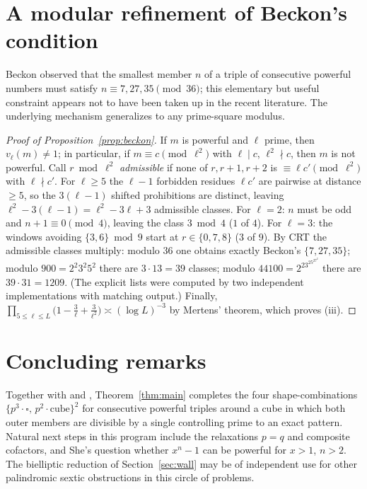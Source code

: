 \documentclass[11pt]{article}
\theoremstyle{remark}
\newcommand{\vp}{v}
\begin{document}
\section{A modular refinement of Beckon's condition}\label{sec:beckon}

Beckon \cite{Beckon} observed that the smallest member $n$ of a triple of consecutive powerful numbers must satisfy $n\equiv7,27,35\pmod{36}$; this elementary but useful constraint appears not to have been taken up in the recent literature. The underlying mechanism generalizes to any prime-square modulus.

\begin{proof}[Proof of Proposition~\ref{prop:beckon}]
If $m$ is powerful and $\ell$ prime, then $\vp_\ell(m)\neq1$; in particular, if $m\equiv c\pmod{\ell^2}$ with $\ell\mid c$, $\ell^2\nmid c$, then $m$ is not powerful. Call $r\bmod \ell^2$ \emph{admissible} if none of $r,r+1,r+2$ is $\equiv\ell c'\pmod {\ell^2}$ with $\ell\nmid c'$. For $\ell\ge5$ the $\ell-1$ forbidden residues $\ell c'$ are pairwise at distance $\ge5$, so the $3(\ell-1)$ shifted prohibitions are distinct, leaving $\ell^2-3(\ell-1)=\ell^2-3\ell+3$ admissible classes. For $\ell=2$: $n$ must be odd and $n+1\equiv0\pmod4$, leaving the class $3\bmod4$ ($1$ of $4$). For $\ell=3$: the windows avoiding $\{3,6\}\bmod 9$ start at $r\in\{0,7,8\}$ ($3$ of $9$). By CRT the admissible classes multiply: modulo $36$ one obtains exactly Beckon's $\{7,27,35\}$; modulo $900=2^2 3^2 5^2$ there are $3\cdot13=39$ classes; modulo $44100=2^23^25^27^2$ there are $39\cdot31=1209$. (The explicit lists were computed by two independent implementations with matching output.) Finally, $\prod_{5\le\ell\le L}\bigl(1-\tfrac{3}{\ell}+\tfrac{3}{\ell^2}\bigr)\asymp(\log L)^{-3}$ by Mertens' theorem, which proves (iii).
\end{proof}

\section{Concluding remarks}

Together with \cite{Chan2025} and \cite{She2025}, Theorem~\ref{thm:main} completes the four shape-combinations $\{p^3\cdot\square,\,p^2\cdot\mathrm{cube}\}^2$ for consecutive powerful triples around a cube in which both outer members are divisible by a single controlling prime to an exact pattern. Natural next steps in this program include the relaxations $p=q$ and composite cofactors, and She's question whether $x^n-1$ can be powerful for $x>1$, $n>2$. The bielliptic reduction of Section~\ref{sec:wall} may be of independent use for other palindromic sextic obstructions in this circle of problems.
\end{document}
